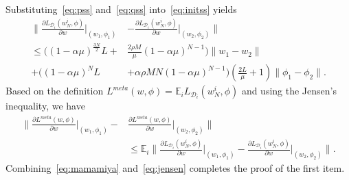 \documentclass{osudissert96}
\begin{document}
Substituting~\cref{eq:pss} and~\cref{eq:qss} into~\cref{eq:initss} yields
\begin{align}\label{eq:mamamiya}
\Big\| \frac{\partial L_{\mathcal{D}_i}( w^i_N,\phi)}{\partial w} \Big |_{(w_1,\phi_1)} &-  \frac{\partial L_{\mathcal{D}_i}( w^i_N,\phi)}{\partial w} \Big |_{(w_2,\phi_2)} \Big\| \nonumber
\\\leq \Big((1-\alpha\mu)^{\frac{3N}{2}} L+& \frac{2\rho M}{\mu}(1-\alpha\mu)^{N-1}\Big) \|w_1-w_2\|  \nonumber
\\+  \Big((1-\alpha\mu)^NL&+\alpha\rho MN(1-\alpha\mu)^{N-1}\Big)\left(\frac{2L}{\mu}+1\right)\|\phi_1-\phi_2\|.
\end{align} 
Based on the definition $ L^{meta}( w,\phi)= \mathbb{E}_i L_{\mathcal{D}_i}( w^i_N,\phi)$ and using the Jensen's inequality, we have 
\begin{align}\label{eq:jensen}
 \Big\| \frac{\partial L^{meta}( w,\phi)}{\partial w} \big |_{(w_1,\phi_1)} -&  \frac{\partial L^{meta}( w,\phi)}{\partial w} \big |_{(w_2,\phi_2)} \Big\|  \nonumber
 \\&\leq \mathbb{E}_i  \Big\| \frac{\partial L_{\mathcal{D}_i}( w^i_N,\phi)}{\partial w} \Big |_{(w_1,\phi_1)} -  \frac{\partial L_{\mathcal{D}_i}( w^i_N,\phi)}{\partial w} \Big |_{(w_2,\phi_2)} \Big\|. 
\end{align}
Combining~\cref{eq:mamamiya} and~\cref{eq:jensen} completes the proof of the first item. 
\end{document}
